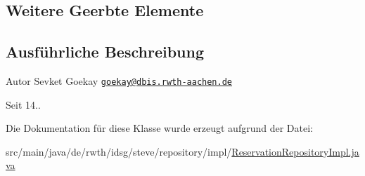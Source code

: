 \subsection*{Weitere Geerbte Elemente}


\subsection{Ausführliche Beschreibung}
\begin{DoxyAuthor}{Autor}
Sevket Goekay \href{mailto:goekay@dbis.rwth-aachen.de}{\tt goekay@dbis.\+rwth-\/aachen.\+de} 
\end{DoxyAuthor}
\begin{DoxySince}{Seit}
14.. 
\end{DoxySince}


Die Dokumentation für diese Klasse wurde erzeugt aufgrund der Datei\+:\begin{DoxyCompactItemize}
\item 
src/main/java/de/rwth/idsg/steve/repository/impl/\hyperlink{_reservation_repository_impl_8java}{Reservation\+Repository\+Impl.\+java}\end{DoxyCompactItemize}
